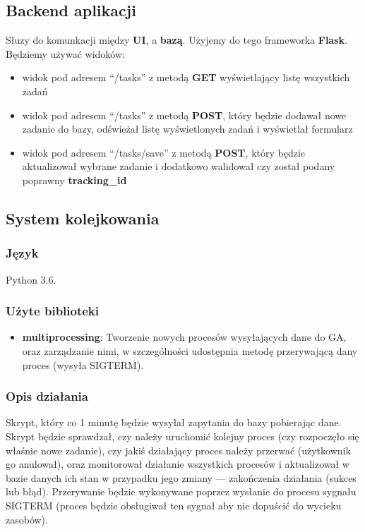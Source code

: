 \documentclass{article}
\begin{document}
\subsection{Backend aplikacji}
Słuzy do komunkacji między \textbf{UI}, a \textbf{bazą}. Użyjemy do tego frameworka \textbf{Flask}. Będziemy używać widoków:
\begin{itemize}
\item widok pod adresem ``/tasks'' z metodą \textbf{GET} wyświetlający listę wszystkich zadań
\item widok pod adresem ``/tasks'' z metodą \textbf{POST}, który będzie dodawał nowe zadanie do bazy, odświeżał listę wyświetlonych zadań i wyświetlał formularz
\item widok pod adresem ``/tasks/save'' z metodą \textbf{POST}, który będzie aktualizował wybrane zadanie i dodatkowo walidował czy został podany poprawny \textbf{tracking\_id}
\end{itemize}

\subsection{System kolejkowania}
\subsubsection{Język}
Python 3.6. 
\subsubsection{Użyte biblioteki}
\begin{itemize}
	\item \textbf{multiprocessing}: Tworzenie nowych procesów wysyłających dane do GA, oraz zarządzanie nimi, w szczególności udostępnia metodę przerywającą dany proces (wysyła SIGTERM).
\end{itemize}
\subsubsection{Opis działania}
Skrypt, który co 1 minutę będzie wysyłał zapytania do bazy pobierając dane. Skrypt będzie sprawdzał, czy należy uruchomić kolejny proces (czy rozpoczęło się właśnie nowe zadanie), czy jakiś działający proces należy przerwać (użytkownik go anulował), oraz monitorował działanie wszystkich procesów i aktualizował w bazie danych ich stan w przypadku jego zmiany --- zakończenia działania (sukces lub błąd). Przerywanie będzie wykonywane poprzez wysłanie do procesu sygnału SIGTERM (proces będzie obsługiwał ten sygnał aby nie dopuścić do wycieku zasobów).
\end{document}
